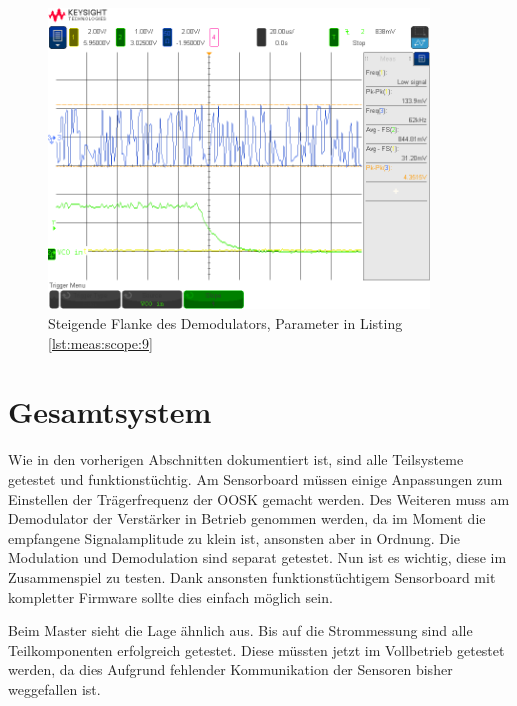 \begin{figure}[h!tb]
    \centering
    \includegraphics[width=0.9\textwidth, trim=0mm 21mm 0mm 11mm, clip]{images/scopeShots/scope_9b.png}
    \caption{Steigende Flanke  des Demodulators, Parameter in Listing \ref{lst:meas:scope:9}}
    \label{fig:meas:scope:9}
\end{figure}


\clearpage
\section{Gesamtsystem}
\label{sec:validierung:total}

Wie  in den  vorherigen Abschnitten  dokumentiert ist,  sind alle  Teilsysteme
getestet und  funktionst\"uchtig.  Am Sensorboard m\"ussen  einige Anpassungen
zum Einstellen der Tr\"agerfrequenz der OOSK gemacht werden. Des Weiteren muss
am Demodulator der  Verst\"arker in Betrieb genommen werden, da  im Moment die
empfangene  Signalamplitude zu  klein  ist, ansonsten  aber  in Ordnung.   Die
Modulation und Demodulation  sind separat getestet. Nun ist  es wichtig, diese
im  Zusammenspiel zu  testen. Dank ansonsten  funktionst\"uchtigem Sensorboard
mit kompletter Firmware sollte dies einfach m\"oglich sein.

Beim Master sieht  die Lage \"ahnlich aus. Bis auf die  Strommessung sind alle
Teilkomponenten  erfolgreich getestet. Diese  m\"ussten  jetzt im  Vollbetrieb
getestet werden, da dies Aufgrund  fehlender Kommunikation der Sensoren bisher
weggefallen ist.

